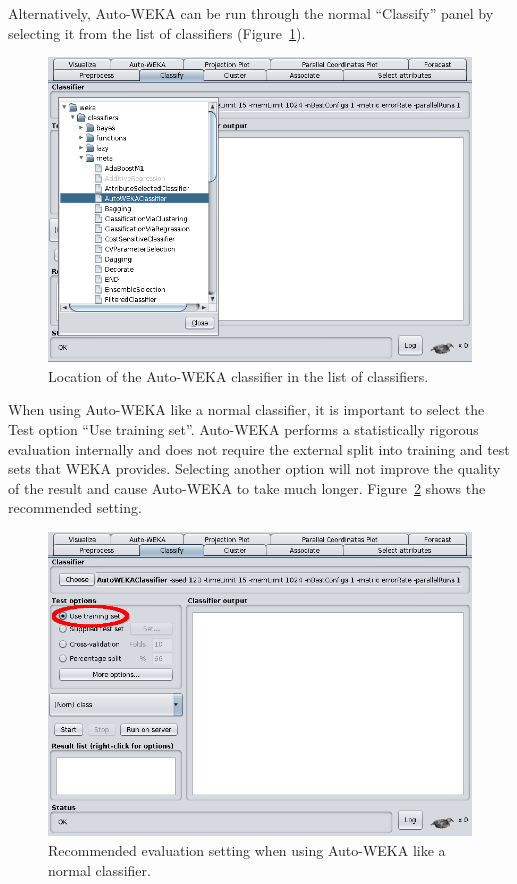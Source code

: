 \documentclass{article}
\begin{document}
Alternatively, Auto-WEKA can be run through the normal ``Classify'' panel by
selecting it from the list of classifiers (Figure~\ref{fig:classifier}).

\begin{figure}[!ht]
\begin{center}
\includegraphics[width=\textwidth]{classifier}
\caption{Location of the Auto-WEKA classifier in the list of classifiers.}
\label{fig:classifier}
\end{center}
\end{figure}

When using Auto-WEKA like a normal classifier, it is important to select the
Test option ``Use training set''. Auto-WEKA performs a statistically rigorous
evaluation internally and does not require the external split into training and
test sets that WEKA provides. Selecting another option will not improve the
quality of the result and cause Auto-WEKA to take much longer.
Figure~\ref{fig:train} shows the recommended setting.

\begin{figure}[!ht]
\begin{center}
\includegraphics[width=\textwidth]{train}
\caption{Recommended evaluation setting when using Auto-WEKA like a normal
classifier.}
\label{fig:train}
\end{center}
\end{figure}
\end{document}
